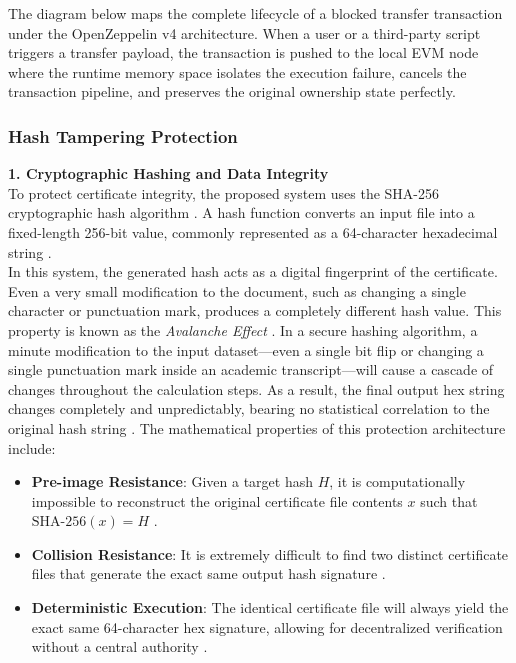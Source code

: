 The diagram below maps the complete lifecycle of a blocked transfer transaction under the OpenZeppelin v4 architecture. When a user or a third-party script triggers a transfer payload, the transaction is pushed to the local EVM node where the runtime memory space isolates the execution failure, cancels the transaction pipeline, and preserves the original ownership state perfectly.



\subsubsection{Hash Tampering Protection}

\textbf{1. Cryptographic Hashing and Data Integrity}\\

To protect certificate integrity, the proposed system uses the SHA-256 cryptographic hash algorithm \cite{fairfield2022tokenized}. A hash function converts an input file into a fixed-length 256-bit value, commonly represented as a 64-character hexadecimal string \cite{openzeppelin2026erc721}.\\

In this system, the generated hash acts as a digital fingerprint of the certificate. Even a very small modification to the document, such as changing a single character or punctuation mark, produces a completely different hash value. This property is known as the \textit{Avalanche Effect} \cite{blockchainineducation}. In a secure hashing algorithm, a minute modification to the input dataset—even a single bit flip or changing a single punctuation mark inside an academic transcript—will cause a cascade of changes throughout the calculation steps. As a result, the final output hex string changes completely and unpredictably, bearing no statistical correlation to the original hash string \cite{nfterc721web}. The mathematical properties of this protection architecture include:

\begin{itemize}
    \item \textbf{Pre-image Resistance}: Given a target hash $H$, it is computationally impossible to reconstruct the original certificate file contents $x$ such that $\text{SHA-256}(x) = H$ \cite{muhamed2018eductx}.
    \item \textbf{Collision Resistance}: It is extremely difficult to find two distinct certificate files that generate the exact same output hash signature \cite{onlinev0835web}.
    \item \textbf{Deterministic Execution}: The identical certificate file will always yield the exact same 64-character hex signature, allowing for decentralized verification without a central authority \cite{gasandfeesetheweb}.
\end{itemize}

